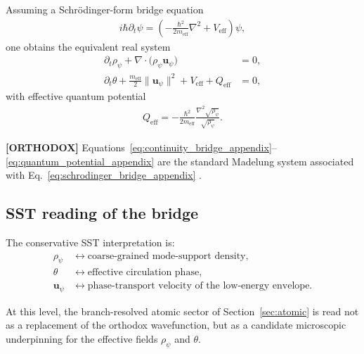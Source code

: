 \documentclass[11pt]{article}
\theoremstyle{definition}
\theoremstyle{plain}
\theoremstyle{remark}
\begin{document}
        Assuming a Schr\"odinger-form bridge equation
        \begin{align}
            i\hbar \partial_t \psi
            =
            \left(
                -\frac{\hbar^2}{2m_{\mathrm{eff}}}\nabla^2 + V_{\mathrm{eff}}
            \right)\psi,
            \label{eq:schrodinger_bridge_appendix}
        \end{align}
        one obtains the equivalent real system
        \begin{align}
            \partial_t \rho_\psi + \nabla\cdot\bigl(\rho_\psi \mathbf{u}_\psi\bigr) &= 0,
            \label{eq:continuity_bridge_appendix}\\
            \partial_t \theta
            +
            \frac{m_{\mathrm{eff}}}{2}\lVert \mathbf{u}_\psi\rVert^2
            + V_{\mathrm{eff}}
            + Q_{\mathrm{eff}} &= 0,
            \label{eq:hamjac_bridge_appendix}
        \end{align}
        with effective quantum potential
        \begin{align}
            Q_{\mathrm{eff}}
            =
            -\frac{\hbar^2}{2m_{\mathrm{eff}}}
            \frac{\nabla^2 \sqrt{\rho_\psi}}{\sqrt{\rho_\psi}}.
            \label{eq:quantum_potential_appendix}
        \end{align}
        
        \textbf{[ORTHODOX]} Equations~\eqref{eq:continuity_bridge_appendix}--\eqref{eq:quantum_potential_appendix} are the standard Madelung system associated with Eq.~\eqref{eq:schrodinger_bridge_appendix} \cite{Schrodinger1926,Madelung1927}.
    
    \subsection{SST reading of the bridge}
        The conservative SST interpretation is:
        \begin{align}
            \rho_\psi
            &\leftrightarrow
            \text{coarse-grained mode-support density},\\
            \theta
            &\leftrightarrow
            \text{effective circulation phase},\\
            \mathbf{u}_\psi
            &\leftrightarrow
            \text{phase-transport velocity of the low-energy envelope}.
        \end{align}
        
        At this level, the branch-resolved atomic sector of Section~\ref{sec:atomic} is read not as a replacement of the orthodox wavefunction, but as a candidate microscopic underpinning for the effective fields \(\rho_\psi\) and \(\theta\).
    
\end{document}
